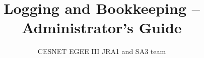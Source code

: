 \documentclass{emi}
\title{Logging and Bookkeeping -- Administrator's Guide}
\author{CESNET EGEE III JRA1 and SA3 team}
\begin{document}
%

\newpage
\tableofcontents

\newpage


\newpage


\newpage


%

\newpage


\newpage


\newpage


\newpage
\nocite{jgc}


\end{document}
